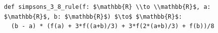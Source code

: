 \documentclass[border=10pt]{standalone}
\begin{document}
\begin{lstlisting}
def simpsons_3_8_rule(f: $\mathbb{R} \\to \\mathbb{R}$, a: $\mathbb{R}$, b: $\mathbb{R}$) $\to$ $\mathbb{R}$:
  (b - a) * (f(a) + 3*f((a+b)/3) + 3*f(2*(a+b)/3) + f(b))/8
\end{lstlisting}
\end{document}

